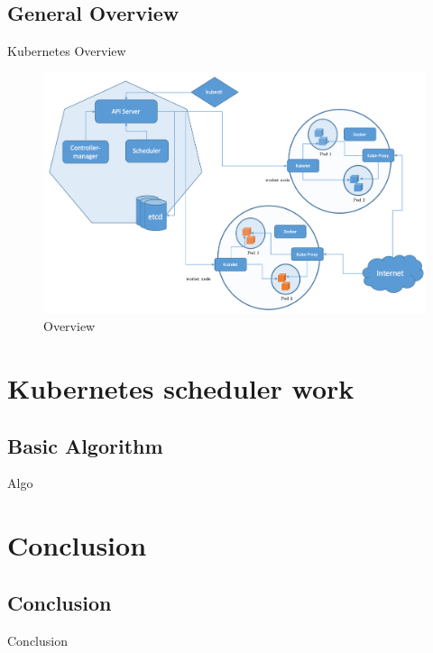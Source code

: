 \documentclass{bredelebeamer}
\begin{document}
\subsection{General Overview}
\begin{frame}{Kubernetes Overview}
\begin{figure}
\centering
\includegraphics[scale=0.37]{images/img24.png}
\caption{Overview}
\end{figure}
\end{frame}



\section{Kubernetes scheduler work }
\subsection{Basic Algorithm}
\begin{frame}{Algo}

\end{frame}


\section{Conclusion}
\subsection{Conclusion}
\begin{frame}{Conclusion}

\end{frame}
\end{document}
